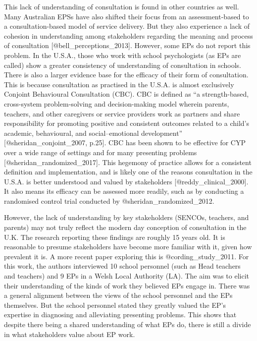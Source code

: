 \documentclass[
]{article}
\begin{document}
This lack of understanding of consultation is found in other countries
as well. Many Australian EPSs have also shifted their focus from an
assessment-based to a consultation-based model of service delivery. But
they also experience a lack of cohesion in understanding among
stakeholders regarding the meaning and process of consultation
{[}@bell\_perceptions\_2013{]}. However, some EPs do not report this
problem. In the U.S.A., those who work with school psychologists (as EPs
are called) show a greater consistency of understanding of consultation
in schools. There is also a larger evidence base for the efficacy of
their form of consultation. This is because consultation as practised in
the U.S.A. is almost exclusively Conjoint Behavioural Consultation
(CBC). CBC is defined as ``a strength-based, cross-system
problem-solving and decision-making model wherein parents, teachers, and
other caregivers or service providers work as partners and share
responsibility for promoting positive and consistent outcomes related to
a child's academic, behavioural, and social--emotional development''
{[}@sheridan\_conjoint\_2007, p.25{]}. CBC has been shown to be
effective for CYP over a wide range of settings and for many presenting
problems {[}@sheridan\_randomized\_2017{]}. This hegemony of practice
allows for a consistent definition and implementation, and is likely one
of the reasons consultation in the U.S.A. is better understood and
valued by stakeholders {[}@reddy\_clinical\_2000{]}. It also means its
efficacy can be assessed more readily, such as by conducting a
randomised control trial conducted by @sheridan\_randomized\_2012.

However, the lack of understanding by key stakeholders (SENCOs,
teachers, and parents) may not truly reflect the modern day conception
of consultation in the U.K. The research reporting these findings are
roughly 15 years old. It is reasonable to presume stakeholders have
become more familiar with it, given how prevalent it is. A more recent
paper exploring this is @cording\_study\_2011. For this work, the
authors interviewed 10 school personnel (such as Head teachers and
teachers) and 9 EPs in a Welsh Local Authority (LA). The aim was to
elicit their understanding of the kinds of work they believed EPs engage
in. There was a general alignment between the views of the school
personnel and the EPs themselves. But the school personnel stated they
greatly valued the EP's expertise in diagnosing and alleviating
presenting problems. This shows that despite there being a shared
understanding of what EPs do, there is still a divide in what
stakeholders value about EP work.
\end{document}
